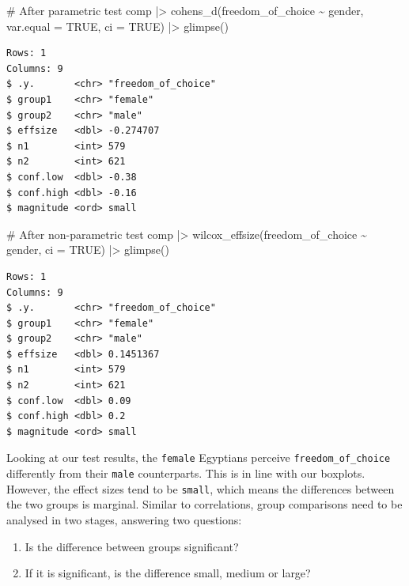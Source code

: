 \documentclass[
  letterpaper,
]{krantz}
\makeatletter
\newenvironment{Shaded}{\begin{snugshade}}{\end{snugshade}}
\newcommand{\AttributeTok}[1]{\textcolor[rgb]{0.40,0.45,0.13}{#1}}
\newcommand{\CommentTok}[1]{\textcolor[rgb]{0.37,0.37,0.37}{#1}}
\newcommand{\ConstantTok}[1]{\textcolor[rgb]{0.56,0.35,0.01}{#1}}
\newcommand{\FunctionTok}[1]{\textcolor[rgb]{0.28,0.35,0.67}{#1}}
\newcommand{\NormalTok}[1]{\textcolor[rgb]{0.00,0.23,0.31}{#1}}
\newcommand{\SpecialCharTok}[1]{\textcolor[rgb]{0.37,0.37,0.37}{#1}}
\newenvironment{kframe}{%
\medskip{}
\setlength{\fboxsep}{.8em}
 \def\at@end@of@kframe{}%
 \ifinner\ifhmode%
  \def\at@end@of@kframe{\end{minipage}}%
  \begin{minipage}{\columnwidth}%
 \fi\fi%
 \def\FrameCommand##1{\hskip\@totalleftmargin \hskip-\fboxsep
 \colorbox{shadecolor}{##1}\hskip-\fboxsep
     \hskip-\linewidth \hskip-\@totalleftmargin \hskip\columnwidth}%
 \MakeFramed {\advance\hsize-\width
   \@totalleftmargin\z@ \linewidth\hsize
   \@setminipage}}%
 {\par\unskip\endMakeFramed%
 \at@end@of@kframe}
\renewenvironment{Shaded}{\begin{kframe}}{\end{kframe}}
\makeatother
\begin{document}
\begin{Shaded}
\begin{Highlighting}[]
\CommentTok{\# After parametric test}
\NormalTok{comp }\SpecialCharTok{|\textgreater{}}
  \FunctionTok{cohens\_d}\NormalTok{(freedom\_of\_choice }\SpecialCharTok{\textasciitilde{}}\NormalTok{ gender,}
           \AttributeTok{var.equal =} \ConstantTok{TRUE}\NormalTok{,}
           \AttributeTok{ci =} \ConstantTok{TRUE}\NormalTok{) }\SpecialCharTok{|\textgreater{}}
  \FunctionTok{glimpse}\NormalTok{()}
\end{Highlighting}
\end{Shaded}

\begin{verbatim}
Rows: 1
Columns: 9
$ .y.       <chr> "freedom_of_choice"
$ group1    <chr> "female"
$ group2    <chr> "male"
$ effsize   <dbl> -0.274707
$ n1        <int> 579
$ n2        <int> 621
$ conf.low  <dbl> -0.38
$ conf.high <dbl> -0.16
$ magnitude <ord> small
\end{verbatim}

\begin{Shaded}
\begin{Highlighting}[]
\CommentTok{\# After non{-}parametric test}
\NormalTok{comp }\SpecialCharTok{|\textgreater{}}
  \FunctionTok{wilcox\_effsize}\NormalTok{(freedom\_of\_choice }\SpecialCharTok{\textasciitilde{}}\NormalTok{ gender,}
                 \AttributeTok{ci =} \ConstantTok{TRUE}\NormalTok{) }\SpecialCharTok{|\textgreater{}}
  \FunctionTok{glimpse}\NormalTok{()}
\end{Highlighting}
\end{Shaded}

\begin{verbatim}
Rows: 1
Columns: 9
$ .y.       <chr> "freedom_of_choice"
$ group1    <chr> "female"
$ group2    <chr> "male"
$ effsize   <dbl> 0.1451367
$ n1        <int> 579
$ n2        <int> 621
$ conf.low  <dbl> 0.09
$ conf.high <dbl> 0.2
$ magnitude <ord> small
\end{verbatim}

Looking at our test results, the \texttt{female} Egyptians perceive
\texttt{freedom\_of\_choice} differently from their \texttt{male}
counterparts. This is in line with our boxplots. However, the effect
sizes tend to be \texttt{small}, which means the differences between the
two groups is marginal. Similar to correlations, group comparisons need
to be analysed in two stages, answering two questions:

\begin{enumerate}
\def\labelenumi{\arabic{enumi}.}
\item
  Is the difference between groups significant?
\item
  If it is significant, is the difference small, medium or large?
\end{enumerate}
\end{document}
